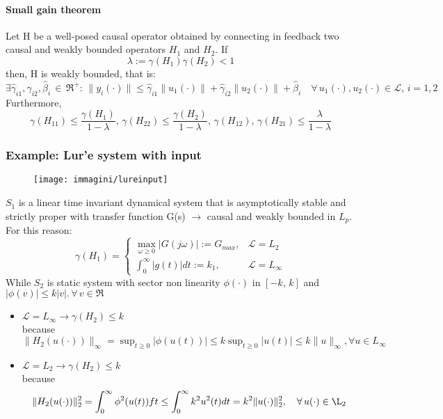 \paragraph{Small gain theorem}
\begin{thm}
	Let H be a well-posed causal operator obtained by connecting in feedback two causal and weakly bounded operators $H_1$ and $H_2$. If \[\lambda:=\gamma(H_1)\gamma(H_2)<1\] then, H is weakly bounded, that is: \[
	\exists \hat{\gamma}_{i1},\hat{\gamma}_{i2},\hat{\beta}_i \, \in\,\Re^+:\, \|y_i(\cdot)\| \le \hat{\gamma}_{i1}\| u_1(\cdot)  \|+\hat{\gamma}_{i2}\|u_2(\cdot)\|+\hat{\beta}_i\quad 	\forall \, u_1(\cdot),u_2(\cdot)\in\mathcal{L},\, i=1,2	
	\]
	Furthermore,
	\[
	\gamma(H_{11})\le \frac{\gamma(H_1)}{1-\lambda},\,\gamma(H_{22})\le \frac{\gamma(H_2)}{1-\lambda},\, \gamma(H_{12}),\,\gamma(H_{21})\le\frac{\lambda}{1-\lambda}
	\]
\end{thm}
\subsubsection{Example: Lur'e system with input}
\begin{figure}[H]
	\centering
	\texttt{[image: immagini/lureinput]}
	\caption{}
	\label{fig:lureinput}
\end{figure}
$S_1$ is a linear time invariant dynamical system that is asymptotically stable and strictly proper with transfer function G(s) $\to$ causal and weakly bounded in $L_p$. For this reason:\[
\gamma(H_1)=\begin{cases}
	\max_{\omega\ge0}|G(j\omega)|:=G_{max}, &\mathcal{L}=L_2\\
	\int_{0}^{\infty}|g(t)|dt:=k_1, & \mathcal{L}=L_{\infty}
\end{cases}
\]
While $S_2$ is static system with sector non linearity $\phi(\cdot)$ in $[-k,\, k]$ and $|\phi(v)|\le k|v|.\,\forall\, v \in\Re$
\begin{itemize}
	\item $\mathcal{L}=L_{\infty}\to \gamma(H_2)\le k$ \\because $\|H_2(u(\cdot))\|_{\infty}=\sup_{t\ge0}|\phi(u(t))|\le k \sup_{t\ge0}|u(t)|\le k \|u\|_{\infty},\forall u \in L_{\infty}$
	\item $\mathcal{L}=L_{2}\to \gamma(H_2)\le k$ \\because\[
	\|H_2(u(\cdot))\|_2^2=\int_{0}^{\infty}\phi^2(u(t))ft \le \int_{0}^{\infty}k^2u^2(t)dt=k^2\|u(\cdot)\|^2_2,\quad\forall\, u(\cdot) \in\L_2
	\]
\end{itemize}
